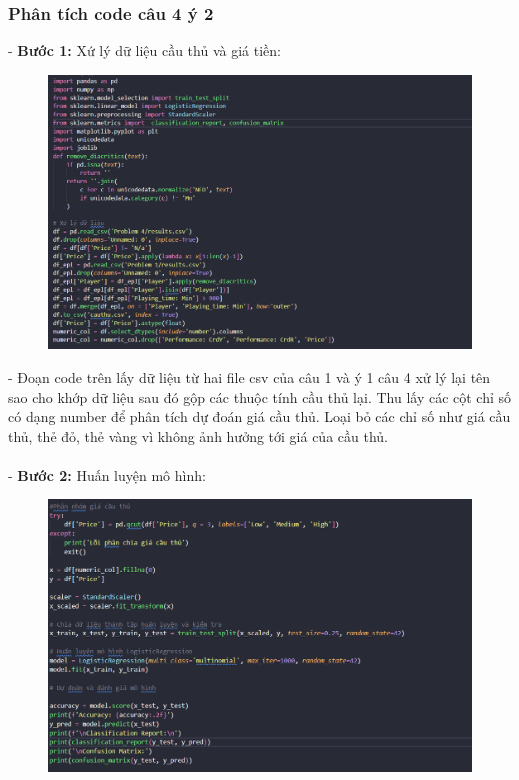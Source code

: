 \documentclass[12pt, letterpaper]{article}
\begin{document}
\subsubsection{Phân tích code câu 4 ý 2}
- \textbf{Bước 1:} Xứ lý dữ liệu cầu thủ và giá tiền:
\begin{figure}[H]
    \centering
    \includegraphics[width=1\linewidth]{img/4_2-1.png}
\end{figure}
- Đoạn code trên lấy dữ liệu từ hai file csv của câu 1 và ý 1 câu 4 xử lý lại tên sao cho khớp dữ liệu sau đó gộp các thuộc tính cầu thủ lại. Thu lấy các cột chỉ số có dạng number để phân tích dự đoán giá cầu thủ.
Loại bỏ các chỉ số như giá cầu thủ, thẻ đỏ, thẻ vàng vì không ảnh hưởng tới giá của cầu thủ.\\\\
- \textbf{Bước 2:} Huấn luyện mô hình:
\begin{figure}[H]
    \centering
    \includegraphics[width=1\linewidth]{img/4-2_2.png}
\end{figure}
\end{document}

